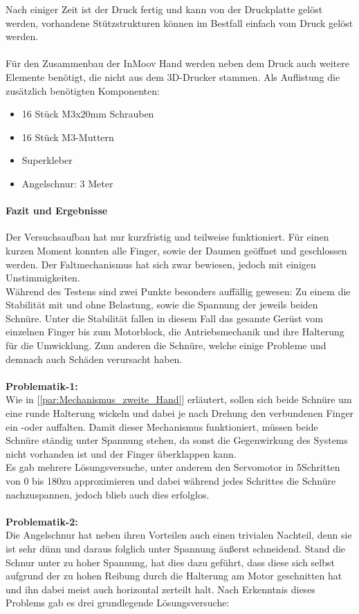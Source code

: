 \documentclass[titlepage,12pt,twoside]{article}
\begin{document}
Nach einiger Zeit ist der Druck fertig und kann von der Druckplatte gelöst werden, vorhandene Stützstrukturen können im Bestfall einfach vom Druck gelöst werden. \\
\\
Für den Zusammenbau der InMoov Hand werden neben dem Druck auch weitere Elemente benötigt, die nicht aus dem 3D-Drucker stammen. 
Als Auflistung die zusätzlich benötigten Komponenten:
\begin{itemize}
	\item 16 Stück M3x20mm Schrauben
	\item 16 Stück M3-Muttern
	\item Superkleber
	\item Angelschnur: 3 Meter
\end{itemize}

\paragraph{Fazit und Ergebnisse}
\hfill \break
\hfill \break
Der Versuchsaufbau hat nur kurzfristig und teilweise funktioniert. Für einen kurzen Moment konnten alle Finger, sowie der Daumen geöffnet und geschlossen werden. Der Faltmechanismus hat sich zwar bewiesen, jedoch mit einigen Unstimmigkeiten. \\
Während des Testens sind zwei Punkte besonders auffällig gewesen: Zu einem die Stabilität mit und ohne Belastung, sowie die Spannung der jeweils beiden Schnüre. Unter die Stabilität fallen in diesem Fall das gesamte Gerüst vom einzelnen Finger 
bis zum Motorblock, die Antriebsmechanik und ihre Halterung für die Umwicklung. Zum anderen die Schnüre, welche einige Probleme und demnach auch Schäden verursacht haben. \\
\\
\textbf{Problematik-1: } \\
Wie in [\textcolor{blue}{\autoref{par:Mechanismus_zweite_Hand}}] erläutert, sollen sich beide Schnüre um eine runde Halterung wickeln und dabei je nach Drehung den verbundenen Finger ein -oder auffalten. Damit dieser Mechanismus funktioniert, müssen beide Schnüre 
ständig unter Spannung stehen, da sonst die Gegenwirkung des Systems nicht vorhanden ist und der Finger überklappen kann. \\
Es gab mehrere Lösungsversuche, unter anderem den Servomotor in 5\textdegree Schritten von 0 bis 180\textdegree zu approximieren und dabei während jedes Schrittes die Schnüre nachzuspannen, jedoch blieb auch dies erfolglos. \\
\\
\textbf{Problematik-2: } \\
Die Angelschnur hat neben ihren Vorteilen auch einen trivialen Nachteil, denn sie ist sehr dünn und daraus folglich unter Spannung äußerst schneidend. Stand die Schnur unter zu hoher Spannung, hat dies dazu geführt, dass diese sich 
selbst aufgrund der zu hohen Reibung durch die Halterung am Motor geschnitten hat und ihn dabei meist auch horizontal zerteilt halt. Nach Erkenntnis dieses Problems gab es drei grundlegende Lösungsversuche:
\end{document}
